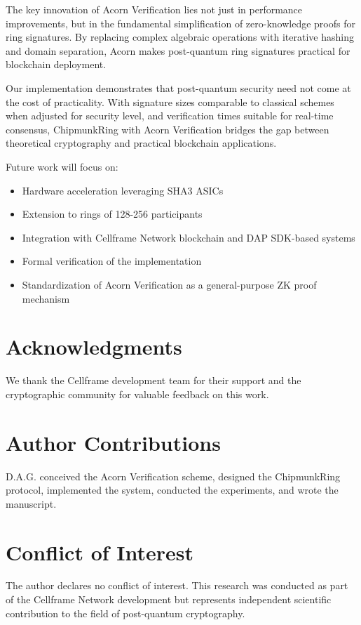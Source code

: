 \documentclass[11pt,a4paper]{article}
\begin{document}
The key innovation of Acorn Verification lies not just in performance improvements, but in the fundamental simplification of zero-knowledge proofs for ring signatures. By replacing complex algebraic operations with iterative hashing and domain separation, Acorn makes post-quantum ring signatures practical for blockchain deployment.

Our implementation demonstrates that post-quantum security need not come at the cost of practicality. With signature sizes comparable to classical schemes when adjusted for security level, and verification times suitable for real-time consensus, ChipmunkRing with Acorn Verification bridges the gap between theoretical cryptography and practical blockchain applications.

Future work will focus on:
\begin{itemize}
\item Hardware acceleration leveraging SHA3 ASICs
\item Extension to rings of 128-256 participants
\item Integration with Cellframe Network blockchain and DAP SDK-based systems
\item Formal verification of the implementation
\item Standardization of Acorn Verification as a general-purpose ZK proof mechanism
\end{itemize}

\section{Acknowledgments}

We thank the Cellframe development team for their support and the cryptographic community for valuable feedback on this work.

\section*{Author Contributions}

D.A.G. conceived the Acorn Verification scheme, designed the ChipmunkRing protocol, implemented the system, conducted the experiments, and wrote the manuscript.

\section*{Conflict of Interest}

The author declares no conflict of interest. This research was conducted as part of the Cellframe Network development but represents independent scientific contribution to the field of post-quantum cryptography.
\end{document}

